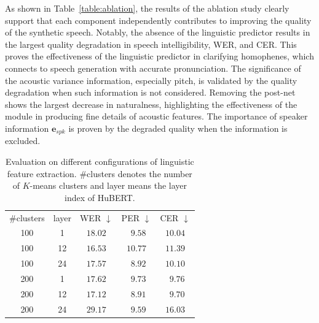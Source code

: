 \documentclass[letterpaper]{article} %
\begin{document}
As shown in Table~\ref{table:ablation}, the results of the ablation study clearly support that each component independently contributes to improving the quality of the synthetic speech.
Notably, the absence of the linguistic predictor results in the largest quality degradation in speech intelligibility, WER, and CER. This proves the effectiveness of the linguistic predictor in clarifying homophenes, which connects to speech generation with accurate pronunciation.
The significance of the acoustic variance information, especially pitch, is validated by the quality degradation when such information is not considered.
Removing the post-net shows the largest decrease in naturalness, highlighting the effectiveness of the module in producing fine details of acoustic features.
The importance of speaker information $\boldsymbol{e}_{spk}$ is proven by the degraded quality when the information is excluded.

\begin{table}
\centering
{
\begin{tabular}{ccccc}
\toprule
\#clusters
&layer   &WER $\downarrow$  &PER $\downarrow$ &CER $\downarrow$    \\  \cmidrule(lr){1-5}

100  &1       &$18.02$ &$~~9.58$  &$10.04$     \\
100  &12 &$\mathbf{16.53}$ & $10.77$ & $11.39$ \\
100  &24 &$17.57$ &$~~8.92$ &$10.10$ \\ \cmidrule(lr){1-5}
200  &1  &$17.62$ &$~~9.73$ &$~~9.76$ \\
200  &12 &$17.12$ &$~~\mathbf{8.91}$ &$~~\mathbf{9.70}$ \\
200  &24 &$29.17$ &$~~9.59$ &$16.03$  \\
\bottomrule
\end{tabular}
}
\caption{Evaluation on different configurations of linguistic feature extraction. \#clusters denotes the number of $K$-means clusters and layer means the layer index of HuBERT.}
\label{table:SSL}
\end{table}

\begin{table}
\centering
{}
\caption{CMOS, WER, and CER results of an ablation study.}
\label{table:ablation}
\end{table}
\end{document}
